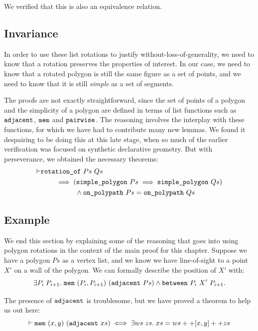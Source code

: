 We verified that this is also an equivalence relation.

\subsection{Invariance}
In order to use these list rotations to justify without-loss-of-generality, we need to know that a rotation preserves the properties of interest. In our case, we need to know that a rotated polygon is still the same figure as a set of points, and we need to know that it is still \emph{simple} as a set of segments. 

The proofs are not exactly straightforward, since the set of points of a polygon and the simplicity of a polygon are defined in terms of list functions such as $\texttt{adjacent}$, $\texttt{mem}$ and $\texttt{pairwise}$. The reasoning involves the interplay with these functions, for which we have had to contribute many new lemmas. We found it despairing to be doing this at this late stage, when so much of the earlier verification was focused on synthetic declarative geometry. But with perseverance, we obtained the necessary theorems:
\begin{equation}\label{eq:PolygonRotateInvariant}
\begin{aligned}
\vdash      &\texttt{rotation\_of}\ Ps\ Qs\\
    &\qquad\implies (\texttt{simple\_polygon}\ Ps \implies \texttt{simple\_polygon}\ Qs)\\
    &\qquad\qquad\quad\wedge \texttt{on\_polypath}\ Ps = \texttt{on\_polypath}\ Qs
  \end{aligned}
\end{equation}

\subsection{Example}
We end this section by explaining some of the reasoning that goes into using polygon rotations in the context of the main proof for this chapter. Suppose we have a polygon $Ps$ as a vertex list, and we know we have line-of-sight to a point $X'$ on a wall of the polygon. We can formally describe the position of $X'$ with:
\begin{displaymath}
  \exists P_i\; P_{i+1}.\; \texttt{mem}\ (P_i,P_{i+1})\ (\texttt{adjacent}\ Ps) \wedge \texttt{between}\ P_i\ X'\ P_{i+1}.
\end{displaymath}

The presence of $\texttt{adjacent}$ is troublesome, but we have proved a theorem to help us out here:
\begin{equation*}
\vdash  \texttt{mem}\ (x,y)\ (\texttt{adjacent}\ xs) \iff 
\exists ws\; zs.\; xs = ws ++ [x,y] ++ zs
\end{equation*}

